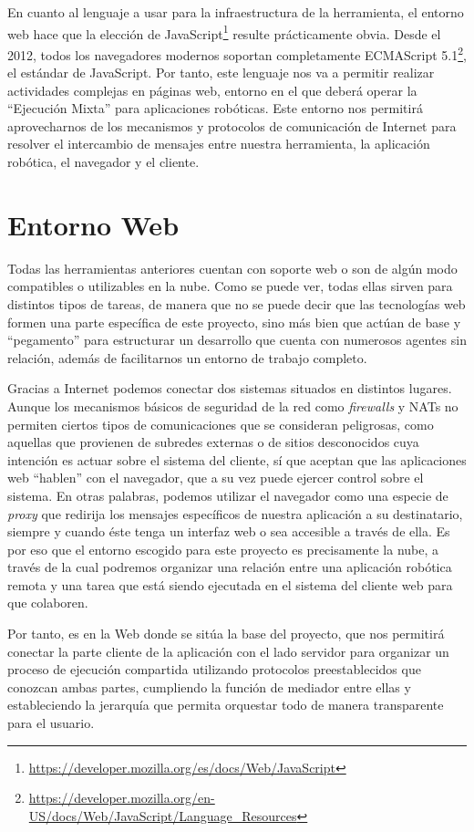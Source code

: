 En cuanto al lenguaje a usar para la infraestructura de la herramienta, el entorno web hace que la elección de JavaScript\footnote{\url{https://developer.mozilla.org/es/docs/Web/JavaScript}} resulte prácticamente obvia. Desde el 2012, todos los navegadores modernos soportan completamente ECMAScript 5.1\footnote{\url{https://developer.mozilla.org/en-US/docs/Web/JavaScript/Language_Resources}}, el estándar de JavaScript. Por tanto, este lenguaje nos va a permitir realizar actividades complejas en páginas web, entorno en el que deberá operar la ``Ejecución Mixta'' para aplicaciones robóticas. Este entorno nos permitirá aprovecharnos de los mecanismos y protocolos de comunicación de Internet para resolver el intercambio de mensajes entre nuestra herramienta, la aplicación robótica, el navegador y el cliente.

\section{Entorno Web}

Todas las herramientas anteriores cuentan con soporte web o son de algún modo compatibles o utilizables en la nube. Como se puede ver, todas ellas sirven para distintos tipos de tareas, de manera que no se puede decir que las tecnologías web formen una parte específica de este proyecto, sino más bien que actúan de base y ``pegamento'' para estructurar un desarrollo que cuenta con numerosos agentes sin relación, además de facilitarnos un entorno de trabajo completo.

Gracias a Internet podemos conectar dos sistemas situados en distintos lugares. Aunque los mecanismos básicos de seguridad de la red como \textit{firewalls} y NATs no permiten ciertos tipos de comunicaciones que se consideran peligrosas, como aquellas que provienen de subredes externas o de sitios desconocidos cuya intención es actuar sobre el sistema del cliente, sí que aceptan que las aplicaciones web ``hablen'' con el navegador, que a su vez puede ejercer control sobre el sistema. En otras palabras, podemos utilizar el navegador como una especie de \textit{proxy} que redirija los mensajes específicos de nuestra aplicación a su destinatario, siempre y cuando éste tenga un interfaz web o sea accesible a través de ella. Es por eso que el entorno escogido para este proyecto es precisamente la nube, a través de la cual podremos organizar una relación entre una aplicación robótica remota y una tarea que está siendo ejecutada en el sistema del cliente web para que colaboren.

Por tanto, es en la Web donde se sitúa la base del proyecto, que nos permitirá conectar la parte cliente de la aplicación con el lado servidor para organizar un proceso de ejecución compartida utilizando protocolos preestablecidos que conozcan ambas partes, cumpliendo la función de mediador entre ellas y estableciendo la jerarquía que permita orquestar todo de manera transparente para el usuario.
